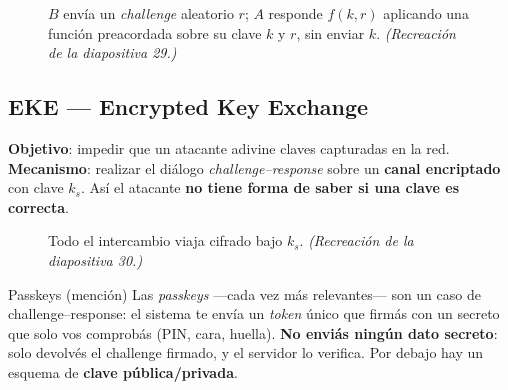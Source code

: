 \documentclass[11pt,a4paper]{article}
\begin{document}
\begin{figure}[h]
\centering
{}
\caption{$B$ envía un \emph{challenge} aleatorio $r$; $A$ responde $f(k,r)$ aplicando una
función preacordada sobre su clave $k$ y $r$, sin enviar $k$.
\textit{(Recreación de la diapositiva 29.)}}
\end{figure}

\subsection{EKE — Encrypted Key Exchange}
\textbf{Objetivo}: impedir que un atacante adivine claves capturadas en la red.
\textbf{Mecanismo}: realizar el diálogo \emph{challenge--response} sobre un \textbf{canal
encriptado} con clave $k_s$. Así el atacante \textbf{no tiene forma de saber si una clave
es correcta}.

\begin{figure}[h]
\centering
{}
\caption{Todo el intercambio viaja cifrado bajo $k_s$.
\textit{(Recreación de la diapositiva 30.)}}
\end{figure}

\begin{practbox}{Passkeys (mención)}
Las \emph{passkeys} —cada vez más relevantes— son un caso de challenge--response: el sistema
te envía un \emph{token} único que firmás con un secreto que solo vos comprobás (PIN, cara,
huella). \textbf{No enviás ningún dato secreto}: solo devolvés el challenge firmado, y el
servidor lo verifica. Por debajo hay un esquema de \textbf{clave pública/privada}.
\end{practbox}
\end{document}
